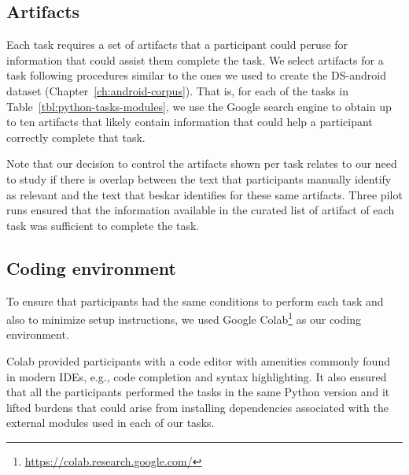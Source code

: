 







\subsection{Artifacts}
\label{cp6:experiment-artifacts}


Each task requires a set of artifacts that a participant could peruse for information that could assist them complete the task.
We select artifacts for a task following procedures similar to the ones we used to create the \acs{DS-android} dataset (Chapter~\ref{ch:android-corpus}). 
That is, for each of the tasks in Table~\ref{tbl:python-tasks-modules}, we use the Google search engine to obtain up to ten artifacts that likely contain 
information that could help a participant correctly complete that task. 



Note that our decision to control the artifacts shown per task relates to our need to study if there is overlap between the text that participants manually identify as relevant and the text that \acs{beskar} identifies for these same artifacts. 
Three pilot runs ensured that the information available in the curated list of artifact of each task was sufficient to complete the task. 



\subsection{Coding environment}
\label{cp6:coding-environment}






To ensure that participants had the same conditions to perform each task
and also to minimize setup instructions, we used Google Colab\footnote{\url{https://colab.research.google.com/}} as our coding environment. 






Colab provided participants with a code editor with amenities commonly found in modern IDEs, e.g., code completion and syntax highlighting. It also ensured that all the participants 
performed the tasks in the same Python version and it lifted 
burdens that could arise from installing dependencies associated with the external modules used in each of our tasks. 



